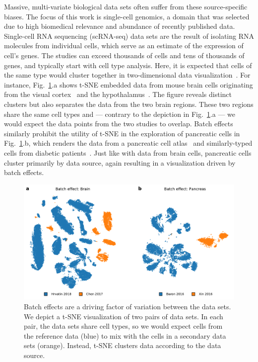 \documentclass[runningheads]{llncs}
\begin{document}
Massive, multi-variate biological data sets often suffer from these
source-specific biases.  The focus of this work is single-cell genomics, a
domain that was selected due to high biomedical relevance and abundance of
recently published data. Single-cell RNA sequencing (scRNA-seq) data sets are
the result of isolating RNA molecules from individual cells, which serve as an
estimate of the expression of cell's genes.  The studies can exceed thousands
of cells and tens of thousands of genes, and typically start with cell type
analysis. Here, it is expected that cells of the same type would cluster
together in two-dimensional data visualization~\cite{Wolf2018}. For instance,
Fig.~\ref{fig:batch_effect}.a shows t-SNE embedded data from mouse brain cells
originating from the visual cortex~\cite{Hrvatin2018} and the
hypothalamus~\cite{Chen2017}. The figure reveals distinct clusters but also
separates the data from the two brain regions. These two regions share the same
cell types and --- contrary to the depiction in Fig.~\ref{fig:batch_effect}.a
--- we would expect the data points from the two studies to overlap. Batch
effects similarly prohibit the utility of t-SNE in the exploration of
pancreatic cells in Fig.~\ref{fig:batch_effect}.b, which renders the data from
a pancreatic cell atlas~\cite{Baron2016} and similarly-typed cells from
diabetic patients~\cite{Xin2016}. Just like with data from brain cells,
pancreatic cells cluster primarily by data source, again resulting in a
visualization driven by batch effects.

\begin{figure}[htbp]
  \includegraphics[width=\textwidth]{batch_effect.pdf}
  \caption{Batch effects are a driving factor of variation between the data
  sets. We depict a t-SNE visualization of two pairs of data sets. In each
  pair, the data sets share cell types, so we would expect cells
  from the reference data (blue) to mix with the cells in a secondary data
  sets (orange). Instead, t-SNE clusters data according to the
  data source.}
  \label{fig:batch_effect}
\end{figure}
\end{document}
